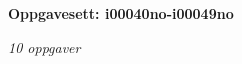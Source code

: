 \centerline{\bf Oppgavesett: i00040no-i00049no}
\vskip 10pt
\centerline{\it 10 oppgaver}\vskip 10pt
\vskip 10pt
